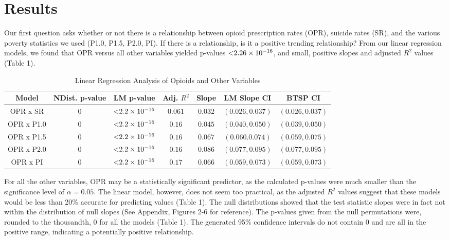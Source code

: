 \documentclass{article}
\newcommand{\<}{\langle}
\renewcommand{\>}{\rangle}
\theoremstyle{definition}
\begin{document}

\section*{Results}
\hspace{\parindent} Our first question asks whether or not there is a relationship between opioid prescription rates (OPR), suicide rates (SR), and the various poverty statistics we used (P1.0, P1.5, P2.0, PI). If there is a relationship, is it a positive trending relationship?  From our linear regression models, we found that OPR versus all other variables yielded p-values $\num{< 2.26e-16}$, and small, positive slopes and adjusted $R^2$ values (Table 1).


\begin{table}[h]
\centering
\caption{Linear Regression Analysis of Opioids and Other Variables}
\begin{tabular}{|c|c|c|c|c|c|c|}
\hline
\textbf{Model} & \textbf{NDist. p-value} & \textbf{LM p-value} & \textbf{Adj. $R^2$} & \textbf{Slope} & \textbf{LM Slope CI} & \textbf{BTSP CI}\\ \hline 
    OPR x SR & $0$ & $\num{<2.2e-16}$ & $0.061$ & $0.032$ & $(0.026, 0.037)$ & $(0.026, 0.037)$ \\ \hline
    OPR x P1.0 & $0$ & $\num{<2.2e-16}$ & $0.16$ & $0.045$ & $(0.040, 0.050)$ & $(0.039, 0.050)$ \\ \hline
    OPR x P1.5 & $0$ & $\num{<2.2e-16}$ & $0.16$ & $0.067$ & $(0.060. 0.074)$ & $(0.059, 0.075)$  \\ \hline
    OPR x P2.0 & $0$ & $\num{<2.2e-16}$ & $0.16$ & $0.086$ & $(0.077, 0.095)$ & $(0.077, 0.095)$  \\ \hline
    OPR x PI & $0$ & $\num{<2.2e-16}$ & $0.17$ & $0.066$ & $(0.059, 0.073)$ & $(0.059, 0.073)$ \\ \hline
\end{tabular}
\label{tb:decay}
\end{table}

For all the other variables, OPR may be a statistically significant predictor, as the calculated p-values were much smaller than the significance level of $\alpha = 0.05$. The linear model, however, does not seem too practical, as the adjusted $R^2$ values suggest that these models would be less than 20\% accurate for predicting values (Table 1). The null distributions showed that the test statistic slopes were in fact not within the distribution of null slopes (See Appendix, Figures 2-6 for reference). The p-values given from the null permutations were, rounded to the thousandth, 0 for all the models (Table 1). The generated 95\% confidence intervals do not contain 0 and are all in the positive range, indicating a potentially positive relationship. 
\end{document}
